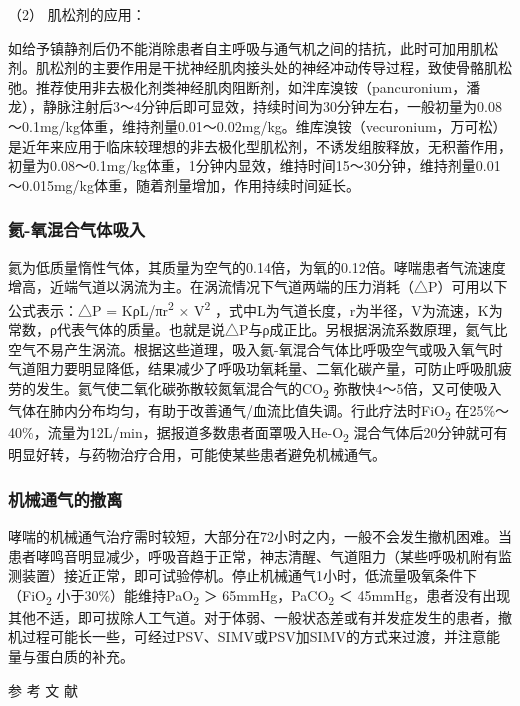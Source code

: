 \hypertarget{text00268.htmlux5cux23CHP9-3-3-3-6-2}{}
（2） 肌松剂的应用：

如给予镇静剂后仍不能消除患者自主呼吸与通气机之间的拮抗，此时可加用肌松剂。肌松剂的主要作用是干扰神经肌肉接头处的神经冲动传导过程，致使骨骼肌松弛。推荐使用非去极化剂类神经肌肉阻断剂，如泮库溴铵（pancuronium，潘龙），静脉注射后3～4分钟后即可显效，持续时间为30分钟左右，一般初量为0.08～0.1mg/kg体重，维持剂量0.01～0.02mg/kg。维库溴铵（vecuronium，万可松）是近年来应用于临床较理想的非去极化型肌松剂，不诱发组胺释放，无积蓄作用，初量为0.08～0.1mg/kg体重，1分钟内显效，维持时间15～30分钟，维持剂量0.01～0.015mg/kg体重，随着剂量增加，作用持续时间延长。

\subsubsection{氦-氧混合气体吸入}

氦为低质量惰性气体，其质量为空气的0.14倍，为氧的0.12倍。哮喘患者气流速度增高，近端气道以涡流为主。在涡流情况下气道两端的压力消耗（△P）可用以下公式表示：△P
= KρL/πr\textsuperscript{2} × V\textsuperscript{2}
，式中L为气道长度，r为半径，V为流速，K为常数，ρ代表气体的质量。也就是说△P与ρ成正比。另根据涡流系数原理，氦气比空气不易产生涡流。根据这些道理，吸入氦-氧混合气体比呼吸空气或吸入氧气时气道阻力要明显降低，结果减少了呼吸功氧耗量、二氧化碳产量，可防止呼吸肌疲劳的发生。氦气使二氧化碳弥散较氮氧混合气的CO\textsubscript{2}
弥散快4～5倍，又可使吸入气体在肺内分布均匀，有助于改善通气/血流比值失调。行此疗法时FiO\textsubscript{2}
在25\%～40\%，流量为12L/min，据报道多数患者面罩吸入He-O\textsubscript{2}
混合气体后20分钟就可有明显好转，与药物治疗合用，可能使某些患者避免机械通气。

\subsubsection{机械通气的撤离}

哮喘的机械通气治疗需时较短，大部分在72小时之内，一般不会发生撤机困难。当患者哮鸣音明显减少，呼吸音趋于正常，神志清醒、气道阻力（某些呼吸机附有监测装置）接近正常，即可试验停机。停止机械通气1小时，低流量吸氧条件下（FiO\textsubscript{2}
小于30\%）能维持PaO\textsubscript{2} ＞ 65mmHg，PaCO\textsubscript{2} ＜
45mmHg，患者没有出现其他不适，即可拔除人工气道。对于体弱、一般状态差或有并发症发生的患者，撤机过程可能长一些，可经过PSV、SIMV或PSV加SIMV的方式来过渡，并注意能量与蛋白质的补充。

\protect\hypertarget{text00269.html}{}{}

\hypertarget{text00269.htmlux5cux23CHP9-3-4}{}
参 考 文 献

